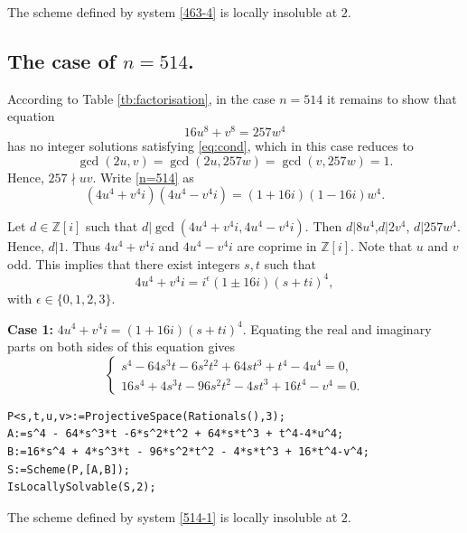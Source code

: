 \documentclass[a4paper,12pt,english,reqno]{amsart}
\newcommand{\Z}{{\mathbb Z}}
\begin{document}
The scheme defined by system \eqref{463-4} is locally insoluble at $2$.


\subsection{The case of $n=514$.}%
According to Table \ref{tb:factorisation}, in the case $n=514$ it remains to
show that equation
\begin{equation}\label{n=514}
16u^8+v^8=257w^4
\end{equation}
has no integer solutions satisfying \eqref{eq:cond}, which in this case reduces to \[\gcd(2u,v)=\gcd(2u,257w)=\gcd(v,257w)=1.\]
Hence, $257\nmid uv$.  
Write \eqref{n=514} as 
\begin{equation}\label{514.1} (4u^4+v^4i)(4u^4-v^4i)=(1+16i)(1-16i)w^4.
\end{equation}

Let $d\in \Z[i]$ such that $d|\gcd(4u^4+v^4i,4u^4-v^4i)$. Then $d| 8u^4$,$d|2v^4$, $d|257w^4$. Hence, $d|1$. Thus $4u^4+v^4i$ and $4u^4-v^4i$ are coprime in $\Z[i]$. Note that $u$ and $v$ odd. 
This implies that there exist integers $s,t$ such that 
\[4u^4+v^4i=i^{\epsilon}(1\pm 16i)(s+ti)^4,\]
with $\epsilon\in \{0,1,2,3\}$.

{\bf Case 1:} $4u^4+v^4i=(1+16i)(s+ti)^4$. Equating the real and imaginary parts on both sides of this equation gives
\begin{equation}\label{514-1}
\begin{cases}
s^4 - 64s^3t -6s^2t^2 + 64st^3 + t^4-4u^4=0,\\
16s^4 + 4s^3t - 96s^2t^2 - 4st^3 + 16t^4-v^4=0.
\end{cases}
\end{equation}

\begin{lstlisting}
P<s,t,u,v>:=ProjectiveSpace(Rationals(),3);
A:=s^4 - 64*s^3*t -6*s^2*t^2 + 64*s*t^3 + t^4-4*u^4;
B:=16*s^4 + 4*s^3*t - 96*s^2*t^2 - 4*s*t^3 + 16*t^4-v^4;
S:=Scheme(P,[A,B]);
IsLocallySolvable(S,2);
\end{lstlisting}
The scheme defined by system \eqref{514-1} is locally insoluble at $2$.
\end{document}
